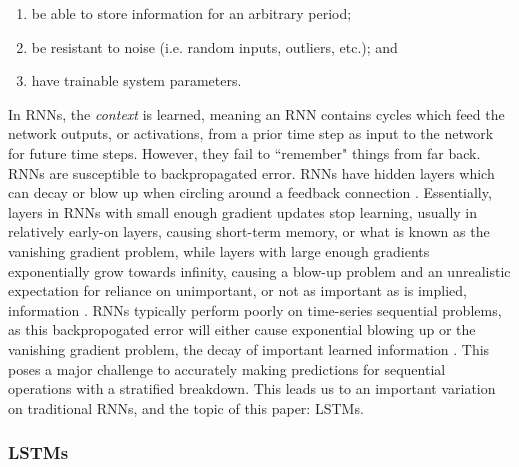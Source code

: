 \documentclass[10pt,twocolumn]{article}
\begin{document}
\begin{enumerate}
    \item be able to store information for an arbitrary period;
    \item be resistant to noise (i.e. random inputs, outliers, etc.); and
    \item have trainable system parameters.
\end{enumerate}

In RNNs, the \emph{context} is learned, meaning an RNN contains cycles which feed the network outputs, or activations, from a prior time step as input to the network for future time steps. However, they fail to ``remember" things from far back. RNNs are susceptible to backpropagated error. RNNs have hidden layers which can decay or blow up when circling around a feedback connection \cite{GentleIntroductionToLSTMNetworks}. Essentially, layers in RNNs with small enough gradient updates stop learning, usually in relatively early-on layers, causing short-term memory, or what is known as the vanishing gradient problem, while layers with large enough gradients exponentially grow towards infinity, causing a blow-up problem and an unrealistic expectation for reliance on unimportant, or not as important as is implied, information \cite{IllustratedGuideToLSTMs}. RNNs typically perform poorly on time-series sequential problems, as this backpropogated error will either cause exponential blowing up or the vanishing gradient problem, the decay of important learned information \cite{GentleIntroductionToLSTMNetworks}. This poses a major challenge to accurately making predictions for sequential operations with a stratified breakdown. This leads us to an important variation on traditional RNNs, and the topic of this paper: LSTMs.

\subsubsection{LSTMs}
\end{document}
